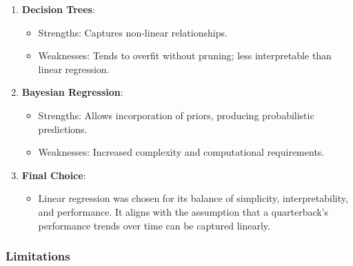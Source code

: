 \documentclass[
  letterpaper,
  DIV=11,
  numbers=noendperiod]{scrartcl}
\providecommand{\tightlist}{%
  \setlength{\itemsep}{0pt}\setlength{\parskip}{0pt}}\usepackage{longtable,booktabs,array}
\begin{document}
\begin{enumerate}
\def\labelenumi{\arabic{enumi}.}
\tightlist
\item
  \textbf{Decision Trees}:

  \begin{itemize}
  \tightlist
  \item
    Strengths: Captures non-linear relationships.\\
  \item
    Weaknesses: Tends to overfit without pruning; less interpretable
    than linear regression.
  \end{itemize}
\item
  \textbf{Bayesian Regression}:

  \begin{itemize}
  \tightlist
  \item
    Strengths: Allows incorporation of priors, producing probabilistic
    predictions.\\
  \item
    Weaknesses: Increased complexity and computational requirements.
  \end{itemize}
\item
  \textbf{Final Choice}:

  \begin{itemize}
  \tightlist
  \item
    Linear regression was chosen for its balance of simplicity,
    interpretability, and performance. It aligns with the assumption
    that a quarterback's performance trends over time can be captured
    linearly.
  \end{itemize}
\end{enumerate}

\subsubsection{Limitations}\label{limitations}
\end{document}
